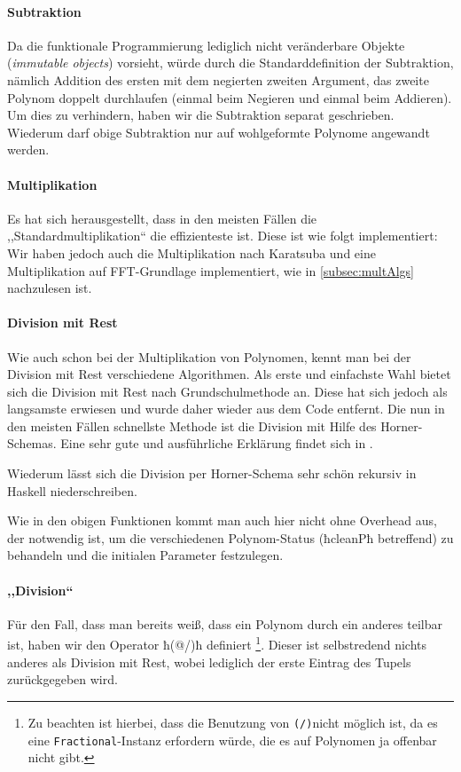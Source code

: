 \paragraph{Subtraktion} Da die funktionale Programmierung lediglich 
nicht veränderbare Objekte (\emph{immutable objects}) vorsieht, würde durch die
Standarddefinition der Subtraktion, nämlich Addition des ersten mit dem
negierten zweiten Argument, das zweite Polynom doppelt durchlaufen (einmal beim
Negieren und einmal beim Addieren). Um dies zu verhindern, haben wir die
Subtraktion separat geschrieben.
Wiederum darf obige Subtraktion nur auf wohlgeformte Polynome angewandt werden.

\paragraph{Multiplikation}
Es hat sich herausgestellt, dass in den meisten Fällen die 
,,Standardmultiplikation`` die effizienteste ist. Diese ist wie folgt
implementiert:
Wir haben jedoch auch die Multiplikation nach Karatsuba und eine Multiplikation
auf FFT-Grundlage implementiert, wie in \autoref{subsec:multAlgs} nachzulesen ist.

\paragraph{Division mit Rest}
Wie auch schon bei der Multiplikation von Polynomen, kennt man bei der Division
mit Rest verschiedene Algorithmen. Als erste und einfachste Wahl bietet sich
die Division mit Rest nach Grundschulmethode an. Diese hat sich jedoch als
langsamste erwiesen und wurde daher wieder aus dem Code entfernt. Die nun in
den meisten Fällen schnellste Methode ist die Division mit Hilfe des
Horner-Schemas. Eine sehr gute und ausführliche Erklärung findet sich 
in \autocite{wiki:synthetic-division}.

Wiederum lässt sich die Division per Horner-Schema sehr schön rekursiv in
Haskell niederschreiben.

Wie in den obigen Funktionen kommt man auch hier nicht ohne Overhead aus, der
notwendig ist, um die verschiedenen Polynom-Status (ħcleanPħ betreffend) zu
behandeln und die initialen Parameter festzulegen.

\paragraph{,,Division``} Für den Fall, dass man bereits weiß, dass ein
Polynom durch ein anderes teilbar ist, haben wir den Operator ħ(@/)ħ definiert
\footnote{Zu beachten ist hierbei, dass die Benutzung 
von \lstinline{(/)}nicht möglich 
ist, da es eine \lstinline{Fractional}-Instanz erfordern würde, 
die es auf Polynomen ja offenbar nicht gibt.}.
Dieser ist selbstredend nichts anderes als Division mit Rest, wobei lediglich
der erste Eintrag des Tupels zurückgegeben wird.

